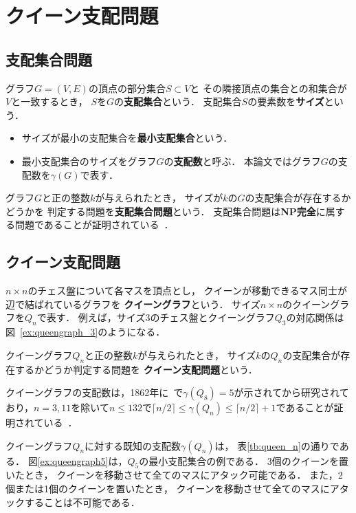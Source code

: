 \chapter{クイーン支配問題}\label{chap:background}

\section{支配集合問題}
グラフ$G=(V,E)$の頂点の部分集合$S\subset V$と
その隣接頂点の集合との和集合が$V$と一致するとき，
$S$を$G$の\textbf{支配集合}という．
支配集合$S$の要素数を\textbf{サイズ}という．
 \begin{itemize}
  \item サイズが最小の支配集合を\textbf{最小支配集合}という．
  \item 最小支配集合のサイズをグラフ$G$の\textbf{支配数}と呼ぶ．
    本論文ではグラフ$G$の支配数を$\gamma(G)$で表す．
 \end{itemize}

グラフ$G$と正の整数$k$が与えられたとき，
サイズが$k$の$G$の支配集合が存在するかどうかを
判定する問題を\textbf{支配集合問題}という．
支配集合問題は\textbf{NP完全}に属する問題であることが証明されている~\cite{Jhonson79}．

\section{クイーン支配問題}
$n\times n$のチェス盤について各マスを頂点とし，
クイーンが移動できるマス同士が辺で結ばれているグラフを
\textbf{クイーングラフ}という．
サイズ$n\times n$のクイーングラフを$Q_n$で表す．
例えば，サイズ3のチェス盤とクイーングラフ$Q_3$の対応関係は
図~\ref{ex:queengraph_3}のようになる．

クイーングラフ$Q_n$と正の整数$k$が与えられたとき，
サイズ$k$の$Q_n$の支配集合が存在するかどうか判定する問題を
\textbf{クイーン支配問題}という． \par
クイーングラフの支配数は，1862年に~\cite{Jaenisch62}で$\gamma(Q_8)=5$が示されてから研究されており，$n=3,11$を除いて$n \leq 132$で$\lceil n/2 \rceil \leq \gamma(Q_n) \leq \lceil n/2 \rceil +1 $であることが証明されている~\cite{Ostergard01}．

クイーングラフ$Q_n$に対する既知の支配数$\gamma(Q_n)$は，
表\ref{tb:queen_n}の通りである．
図\ref{ex:queengraph5}は，$Q_5$の最小支配集合の例である．
3個のクイーンを置いたとき，
クイーンを移動させて全てのマスにアタック可能である．
また，2個または1個のクイーンを置いたとき，
クイーンを移動させて全てのマスにアタックすることは不可能である．

